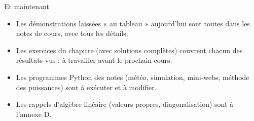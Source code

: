 \begin{frame}{Et maintenant}
  \begin{itemize}
    \item Les démonstrations laissées « au tableau » aujourd'hui sont
      toutes dans les notes de cours, avec tous les détails.
    \item Les exercices du chapitre (avec solutions complètes) couvrent
      chacun des résultats vus : à travailler avant le prochain cours.
    \item Les programmes Python des notes (météo, simulation, mini-webs,
      méthode des puissances) sont à exécuter et à modifier.
    \item Les rappels d'algèbre linéaire (valeurs propres,
      diagonalisation) sont à l'annexe D.
  \end{itemize}
\end{frame}
